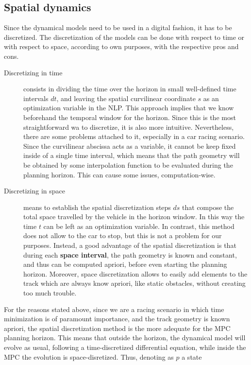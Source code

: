 \documentclass[a4paper, onecolumn, 11pt]{article}
\begin{document}
\subsection{Spatial dynamics} \label{spatial}
Since the dynamical models need to be used in a digital fashion, it has to be
discretized. The discretization of the models can be done with respect to time
or with respect to space, according to own purposes, with the respective pros
and cons.
\begin{description}
    \item[Discretizing in time] consists in dividing the time over the horizon in
    small well-defined time intervals $dt$, and leaving the spatial curvilinear
    coordinate $s$ as an optimization variable in the NLP. This approach implies
    that we know beforehand the temporal window for the horizon. Since this is
    the most straightforward wa to discretize, it is also more intuitive.
    Nevertheless, there are some problems attached to it, especially in a car
    racing scenario. Since the curvilinear abscissa acts as a variable, it
    cannot be keep fixed inside of a single time interval, which means that the
    path geometry will be obtained by some interpolation function to be
    evaluated during the planning horizon. This can cause some issues,
    computation-wise.
    \item[Discretizing in space] means to establish the spatial
    discretization steps $ds$ that compose the total space travelled by the
    vehicle in the horizon window. In this way the time $t$ can be left as an
    optimization variable. In contrast, this method does not allow to the car to
    stop, but this is not a problem for our purposes. Instead, a good advantage
    of the spatial discretization is that during each \textbf{space interval},
    the path geometry is known and constant, and thus can be computed apriori,
    before even starting the planning horizon. Moreover, space discretization
    allows to easily add elements to the track which are always know apriori,
    like static obstacles, without creating too much trouble.
\end{description}
For the reasons stated above, since we are a racing scenario in which time
minimization is of paramount importance, and the track geometry is known
apriori, the spatial discretization method is the more adequate for the MPC
planning horizon. This means that outside the horizon, the dynamical model will
evolve as usual, following a time-discretized differential equation, while
inside the MPC the evolution is space-disretized. Thus, denoting as $p$ a state
\end{document}
